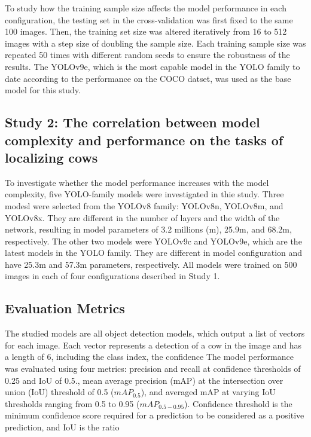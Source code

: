 To study how the training sample size affects the model performance in each configuration, the testing set in the cross-validation was first fixed to the same 100 images. Then, the training set size was altered iteratively from 16 to 512 images with a step size of doubling the sample size. Each training sample size was repeated 50 times with different random seeds to ensure the robustness of the results. The YOLOv9e, which is the most capable model in the YOLO family to date according to the performance on the COCO datset, was used as the base model for this study.


\subsection*{Study 2: The correlation between model complexity and performance on the tasks of localizing cows}

To investigate whether the model performance increases with the model complexity, five YOLO-family models were investigated in thie study. Three modesl were selected from the YOLOv8 family: YOLOv8n, YOLOv8m, and YOLOv8x. They are different in the number of layers and the width of the network, resulting in model parameters of 3.2 millions (m), 25.9m, and 68.2m, respectively. The other two models were YOLOv9c and YOLOv9e, which are the latest models in the YOLO family. They are different in model configuration and have 25.3m and 57.3m parameters, respectively. All models were trained on 500 images in each of four configurations described in Study 1.

\subsection*{Evaluation Metrics}

The studied models are all object detection models, which output a list of vectors for each image. Each vector represents a detection of a cow in the image and has a length of 6, including the class index, the confidence
The model performance was evaluated using four metrics: precision and recall at confidence thresholds of 0.25 and IoU of 0.5., mean average precision (mAP) at the intersection over union (IoU) threshold of 0.5 ($mAP_{0.5}$), and averaged mAP at varying IoU thresholds ranging from 0.5 to 0.95 ($mAP_{0.5-0.95}$). Confidence threshold is the minimum confidence score required for a prediction to be considered as a positive prediction, and IoU is the ratio




